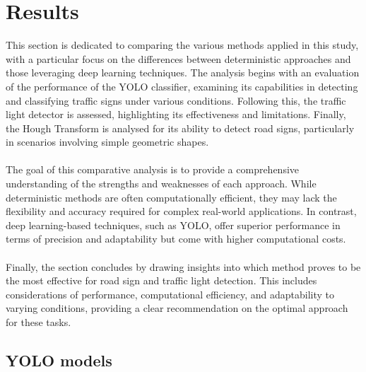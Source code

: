 \documentclass[10pt,conference,a4paper]{IEEEtran}
\begin{document}
\section{Results}
This section is dedicated to comparing the various methods applied in this study, with a particular focus on the differences between deterministic approaches and those leveraging deep learning techniques. The analysis begins with an evaluation of the performance of the YOLO classifier, examining its capabilities in detecting and classifying traffic signs under various conditions. Following this, the traffic light detector is assessed, highlighting its effectiveness and limitations. Finally, the Hough Transform is analysed for its ability to detect road signs, particularly in scenarios involving simple geometric shapes.\\\\
The goal of this comparative analysis is to provide a comprehensive understanding of the strengths and weaknesses of each approach. While deterministic methods are often computationally efficient, they may lack the flexibility and accuracy required for complex real-world applications. In contrast, deep learning-based techniques, such as YOLO, offer superior performance in terms of precision and adaptability but come with higher computational costs.\\\\
Finally, the section concludes by drawing insights into which method proves to be the most effective for road sign and traffic light detection. This includes considerations of performance, computational efficiency, and adaptability to varying conditions, providing a clear recommendation on the optimal approach for these tasks.
\subsection{YOLO models}
\end{document}
